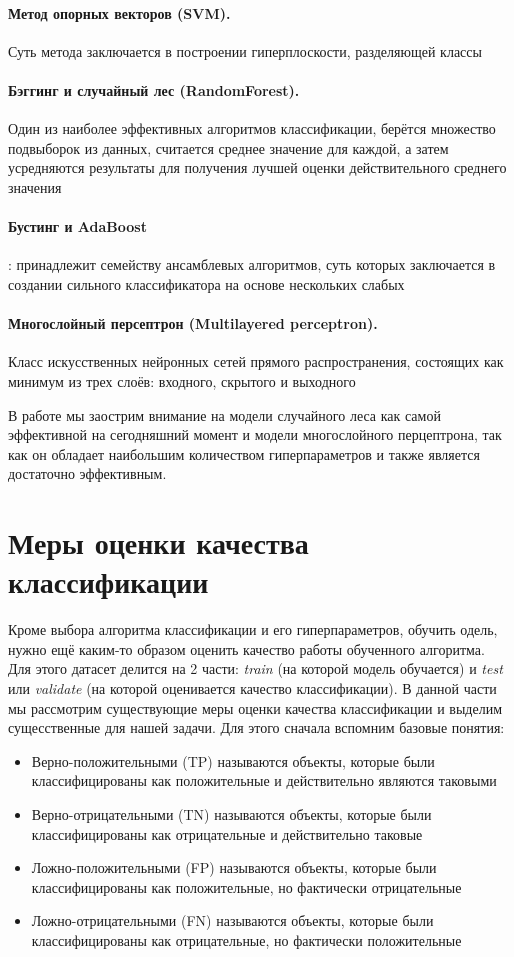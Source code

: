 \documentclass[times,specification,annotation]{itmo-student-thesis}
\begin{document}
	\paragraph{Метод опорных векторов (SVM).} Суть метода заключается в построении гиперплоскости, разделяющей классы
	\paragraph{Бэггинг и случайный лес (RandomForest).} Один из наиболее эффективных алгоритмов классификации, берётся множество подвыборок из данных, считается среднее значение для каждой, а затем усредняются результаты для получения лучшей оценки действительного среднего значения
	\paragraph{Бустинг и AdaBoost}: принадлежит семейству ансамблевых алгоритмов, суть которых заключается в создании сильного классификатора на основе нескольких слабых
	\paragraph{Многослойный персептрон (Multilayered perceptron).} Класс искусственных нейронных сетей прямого распространения, состоящих как минимум из трех слоёв: входного, скрытого и выходного 

	В работе мы заострим внимание на модели случайного леса как самой эффективной на сегодняшний момент и модели многослойного перцептрона, так как он обладает наибольшим количеством гиперпараметров и также является достаточно эффективным.
	
	\section{Меры оценки качества классификации} \label{s:mcl}
	Кроме выбора алгоритма классификации и его гиперпараметров, обучить одель, нужно ещё каким-то образом оценить качество работы обученного алгоритма. Для этого датасет делится на 2 части: \textit{train} (на которой модель обучается) и \textit{test} или \textit{validate} (на которой оценивается качество классификации). В данной части мы рассмотрим существующие меры оценки качества классификации и выделим сущесственные для нашей задачи. Для этого сначала вспомним базовые понятия\cite{yu2019anyprecision}:
	\begin{itemize}
		\item Верно-положительными (TP) называются объекты, которые были классифицированы как положительные и действительно являются таковыми
		\item Верно-отрицательными (TN) называются объекты, которые были классифицированы как отрицательные и действительно таковые 
		\item Ложно-положительными (FP) называются объекты, которые были классифицированы как положительные, но фактически отрицательные
		\item Ложно-отрицательными (FN) называются объекты, которые были классифицированы как отрицательные, но фактически положительные
	\end{itemize}
\end{document}
